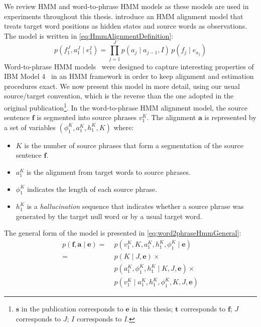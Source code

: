 We review HMM and word-to-phrase HMM models as these models are used
in experiments throughout this thesis.
\citet{vogel-ney-tillmann} introduce an HMM alignment model
that treats target word positions as hidden states and source words as
observations. The model is written in \autoref{eq:HmmAlignmentDefinition}:
%
\begin{equation}
  p(f_1^J, a_1^J \mid e_1^I) = \prod_{j=1}^J p(a_j \mid a_{j-1},I) \, p(f_j \mid e_{a_j})
  \label{eq:HmmAlignmentDefinition}
\end{equation}
%
Word-to-phrase HMM models~\citep{deng-and-byrne:2008:ASLP} were designed to
capture interesting properties of IBM Model
4~\citep{brown-dellapietra-dellapietra-mercer-1993} in an HMM framework in order
to keep alignment and estimation procedures exact. We now present this model
in more detail, using our usual source/target convention, which is the reverse
than the one adopted in the original
publication\footnote{$\bm{s}$ in the publication corresponds to $\bm{e}$ in this thesis;
$\bm{t}$ corresponds to $\bm{f}$; $J$ corresponds to $J$; $I$ corresponds to $I$.}.
In the word-to-phrase HMM alignment model, the source sentence
$\bm{f}$ is segmented into source phrases $v_1^K$.
The alignment $\bm{a}$ is represented by a set of variables
$(\phi_1^K, a_1^K, h_1^K, K)$ where:
%
\begin{itemize}
  \item $K$ is the number of source phrases that form a segmentation of the source sentence $\bm{f}$.
  \item $a_1^K$ is the alignment from target words to source phrases.
  \item $\phi_1^K$ indicates the length of each source phrase.
  \item $h_1^K$ is a \emph{hallucination} sequence that indicates whether
    a source phrase was generated by the target null word
    or by a usual target word.
\end{itemize}
%
The general form of the model is presented in \autoref{eq:word2phraseHmmGeneral}:
%
\begin{equation}
  \begin{split}
  p(\bm{f}, \bm{a} \mid \bm{e}) = & \; p(v_1^K, K, a_1^K, h_1^K, \phi_1^K \mid \bm{e}) \\
                                = & \; p(K \mid J, \bm{e}) \times \\
                                & \; p(a_1^K, \phi_1^K, h_1^K \mid K, J, \bm{e}) \times \\
                                & \; p(v_1^K \mid a_1^K, h_1^K, \phi_1^K, K, J, \bm{e})
  \end{split}
  \label{eq:word2phraseHmmGeneral}
\end{equation}
